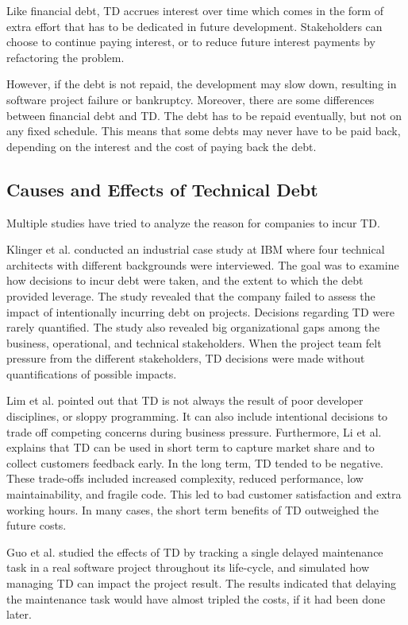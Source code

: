 Like financial debt, TD accrues interest over time which comes in the form of extra effort that has to be dedicated in future development\cite{p31-guo,p35-klinger}. Stakeholders can choose to continue paying interest, or to reduce future interest payments by refactoring the problem\cite{url-fowler}. 


However, if the debt is not repaid, the development may slow down, resulting in software project failure or bankruptcy\cite{p50-allman}. Moreover, there are some differences between financial debt and TD. The debt has to be repaid eventually, but not on any fixed schedule\cite{p50-allman}. This means that some debts may never have to be paid back, depending on the interest and the cost of paying back the debt\cite{foser076-brown}.


\subsection{Causes and Effects of Technical Debt}
Multiple studies have tried to analyze the reason for companies to incur TD.

Klinger et al.\cite{p35-klinger} conducted an industrial case study at IBM where four technical architects with different backgrounds were interviewed. The goal was to examine how decisions to incur debt were taken, and the extent to which the debt provided leverage\cite{p35-klinger}. The study revealed that the company failed to assess the impact of intentionally incurring debt on projects. Decisions regarding TD were rarely quantified. The study also revealed big organizational gaps among the business, operational, and technical stakeholders. When the project team felt pressure from the different stakeholders, TD decisions were made without quantifications of possible impacts.

Lim et al.\cite{lim-taksande} pointed out that TD is not always the result of poor developer disciplines, or sloppy programming. It can also include intentional decisions to trade off competing concerns during business pressure. Furthermore, Li et al. explains that TD can be used in short term to capture market share and to collect customers feedback early. In the long term, TD tended to be negative. These trade-offs included increased complexity, reduced performance, low maintainability, and fragile code. This led to bad customer satisfaction and extra working hours. In many cases, the short term benefits of TD outweighed the future costs.

Guo et al.\cite{guo2011tracking} studied the effects of TD by tracking a single delayed maintenance task in a real software project throughout its life-cycle, and simulated how managing TD can impact the project result. The results indicated that delaying the maintenance task would have almost tripled the costs, if it had been done later.


